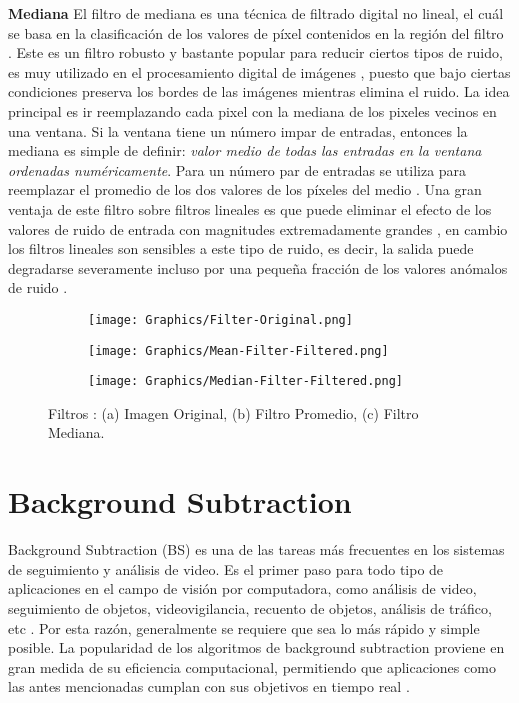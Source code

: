\textbf{Mediana}
El filtro de mediana es una técnica de filtrado digital no lineal, el cuál se basa en la clasificación de los valores de píxel contenidos en la región del filtro \cite{MandarMeghana}. Este es un filtro robusto y bastante popular para reducir ciertos tipos de ruido, es muy utilizado en el procesamiento digital de imágenes \cite{RuchikaGaurav}, puesto que bajo ciertas condiciones preserva los bordes de las imágenes mientras elimina el ruido. La idea principal es ir reemplazando cada pixel con la mediana de los pixeles vecinos en una ventana. Si la ventana tiene un número impar de entradas, entonces la mediana es simple de definir: \textit{valor medio de todas las entradas en la ventana ordenadas numéricamente}. Para un número par de entradas se utiliza para reemplazar el promedio de los dos valores de los píxeles del medio \cite{PawanManojSumitAshok}. Una gran ventaja de este filtro sobre filtros lineales es que puede eliminar el efecto de los valores de ruido de entrada con magnitudes extremadamente grandes \cite{MandarMeghana}, en cambio los filtros lineales son sensibles a este tipo de ruido, es decir, la salida puede degradarse severamente incluso por una pequeña fracción de los valores anómalos de ruido \cite{JamesYixinStephen, PawanManojSumitAshok}.

\begin{figure}[h!]
    \centering
    \begin{subfigure}[b]{0.32\linewidth}
        \centering
	    \texttt{[image: Graphics/Filter-Original.png]}
        \caption{}
    \end{subfigure}    
    \begin{subfigure}[b]{0.32\linewidth}
        \centering
	    \texttt{[image: Graphics/Mean-Filter-Filtered.png]}
        \caption{}
    \end{subfigure}    
    \begin{subfigure}[b]{0.32\linewidth}
        \centering
	    \texttt{[image: Graphics/Median-Filter-Filtered.png]}
        \caption{}
    \end{subfigure}    
    \caption{Filtros : (a) Imagen Original, (b) Filtro Promedio, (c) Filtro Mediana.}
    \label{fig:filters}
\end{figure}    

\section{Background Subtraction}

Background Subtraction (BS) es una de las tareas más frecuentes en los sistemas de seguimiento y análisis de video. Es el primer paso para todo tipo de aplicaciones en el campo de visión por computadora, como análisis de video, seguimiento de objetos, videovigilancia, recuento de objetos, análisis de tráfico, etc \cite{GuangleTaoJiandanPingWenwu}. Por esta razón, generalmente se requiere que sea lo más rápido y simple posible. La popularidad de los algoritmos de background subtraction proviene en gran medida de su eficiencia computacional, permitiendo que aplicaciones como las antes mencionadas cumplan con sus objetivos en tiempo real \cite{DeepjoySarat}.


